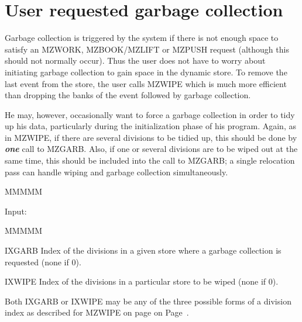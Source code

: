 \section{User requested garbage collection}
\par Garbage collection is triggered by the system if there is not
enough space to satisfy an MZWORK, MZBOOK/MZLIFT or MZPUSH request
(although this should not normally occur).
Thus the user does not have to worry about initiating
garbage collection to gain space in the dynamic store.
To remove the last event from the store,
the user calls MZWIPE which is much more efficient
than dropping the banks of the event followed by garbage collection.
\par He may, however, occasionally want to force a garbage collection
in order to tidy up his data,
particularly during the initialization phase of his program.
Again, as in MZWIPE, if there are several divisions to be tidied up,
this should be done by {\bf\it one} call to MZGARB. Also,
if one or several divisions are to be wiped out at the same time,
this should be included into the call to MZGARB;
a single relocation pass can handle wiping
and garbage collection simultaneously.
\begin{DL}{MMMMM}
\item[Input:
]
\begin{DL}{MMMMM}
\item[IXGARB
]Index of the divisions in a given store where a garbage collection
is requested (none if 0).
\item[IXWIPE
]Index of the divisions in a particular store
to be wiped (none if 0).
\end{DL}
\end{DL}
\par
Both IXGARB or IXWIPE may be any of the three possible forms
of a division index as described for MZWIPE on page
on Page~\pageref{MZWIPE FORM=PAGEONLY}.
